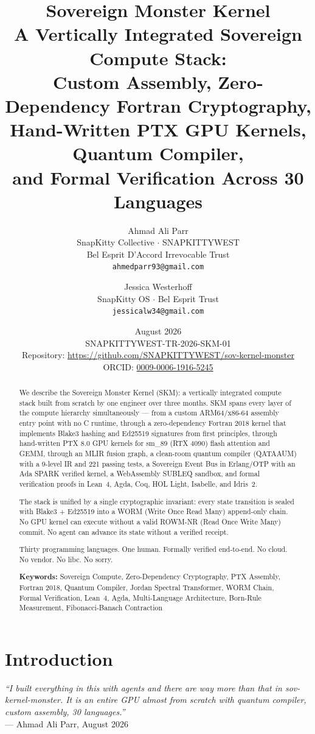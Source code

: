 \documentclass[11pt,a4paper]{article}
\title{\textbf{Sovereign Monster Kernel}\\
\large A Vertically Integrated Sovereign Compute Stack:\\
Custom Assembly, Zero-Dependency Fortran Cryptography,\\
Hand-Written PTX GPU Kernels, Quantum Compiler,\\
and Formal Verification Across 30 Languages}
\author{Ahmad Ali Parr\\
SnapKitty Collective $\cdot$ SNAPKITTYWEST\\
Bel Esprit D'Accord Irrevocable Trust\\
\texttt{ahmedparr93@gmail.com}
\and
Jessica Westerhoff\\
SnapKitty OS $\cdot$ Bel Esprit Trust\\
\texttt{jessicalw34@gmail.com}}
\date{August 2026\\
\small SNAPKITTYWEST-TR-2026-SKM-01\\
\small Repository: \url{https://github.com/SNAPKITTYWEST/sov-kernel-monster}\\
\small ORCID: \href{https://orcid.org/0009-0006-1916-5245}{0009-0006-1916-5245}}
\begin{document}
\maketitle

\begin{abstract}
We describe the Sovereign Monster Kernel (SKM): a vertically integrated
compute stack built from scratch by one engineer over three months. SKM
spans every layer of the compute hierarchy simultaneously --- from a
custom ARM64/x86-64 assembly entry point with no C runtime, through a
zero-dependency Fortran 2018 kernel that implements Blake3 hashing and
Ed25519 signatures from first principles, through hand-written PTX 8.0
GPU kernels for sm\_89 (RTX 4090) flash attention and GEMM, through an
MLIR fusion graph, a clean-room quantum compiler (QATAAUM) with a 9-level
IR and 221 passing tests, a Sovereign Event Bus in Erlang/OTP with an Ada
SPARK verified kernel, a WebAssembly SUBLEQ sandbox, and formal
verification proofs in Lean~4, Agda, Coq, HOL Light, Isabelle, and
Idris~2.

The stack is unified by a single cryptographic invariant: every state
transition is sealed with Blake3 + Ed25519 into a WORM (Write Once Read
Many) append-only chain. No GPU kernel can execute without a valid
ROWM-NR (Read Once Write Many) commit. No agent can advance its state
without a verified receipt.

Thirty programming languages. One human. Formally verified end-to-end.
No cloud. No vendor. No libc. No sorry.

\bigskip
\noindent\textbf{Keywords:} Sovereign Compute, Zero-Dependency Cryptography,
PTX Assembly, Fortran 2018, Quantum Compiler, Jordan Spectral Transformer,
WORM Chain, Formal Verification, Lean~4, Agda, Multi-Language Architecture,
Born-Rule Measurement, Fibonacci-Banach Contraction
\end{abstract}

\tableofcontents
\newpage

\section{Introduction}

\begin{authorvoice}
\textit{``I built everything in this with agents and there are way more
than that in sov-kernel-monster. It is an entire GPU almost from scratch
with quantum compiler, custom assembly, 30 languages.''}\\
\hfill --- Ahmad Ali Parr, August 2026
\end{authorvoice}
\end{document}
